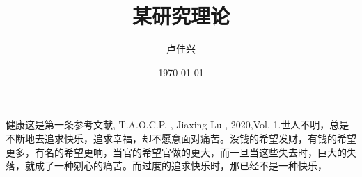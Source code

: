 \documentclass[a4paper,12pt]{report}
\begin{document}
    
\title{某研究理论}  %
\author{卢佳兴}  %
\date{\today}    %
\maketitle 



    \begin{thebibliography}{123456}
        \bibitem 健康这是第一条参考文献, T.A.O.C.P. , Jiaxing Lu , 2020,Vol. 1.世人不明，总是不断地去追求快乐，追求幸福，却不愿意面对痛苦。没钱的希望发财，有钱的希望更多，有名的希望更响，当官的希望官做的更大，而一旦当这些失去时，巨大的失落，就成了一种剜心的痛苦。而过度的追求快乐时，那已经不是一种快乐，
   
    \end{thebibliography}
\tableofcontents






\end{document}
